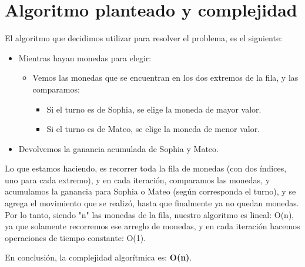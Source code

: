 \section{Algoritmo planteado y complejidad}

El algoritmo que decidimos utilizar para resolver el problema, es el siguiente:
\begin {itemize}
\item Mientras hayan monedas para elegir:
    \begin {itemize}
    \item Vemos las monedas que se encuentran en los dos extremos de la fila, y las comparamos:
        \begin {itemize}
        \item Si el turno es de Sophia, se elige la moneda de mayor valor.
        \item Si el turno es de Mateo, se elige la moneda de menor valor.
        \end {itemize}
    \end {itemize}
\item Devolvemos la ganancia acumulada de Sophia y Mateo.
\end {itemize}

Lo que estamos haciendo, es recorrer toda la fila de monedas (con dos índices, uno para cada extremo), y en cada iteración, comparamos las monedas, y acumulamos la ganancia para Sophia o Mateo (según corresponda el turno), y se agrega el movimiento que se realizó, hasta que finalmente ya no quedan monedas. Por lo tanto, siendo "n" las monedas de la fila, nuestro algoritmo es lineal: O(n), ya que solamente recorremos ese arreglo de monedas, y en cada iteración hacemos operaciones de tiempo constante: O(1).

En conclusión, la complejidad algorítmica es: \textbf{O(n)}.